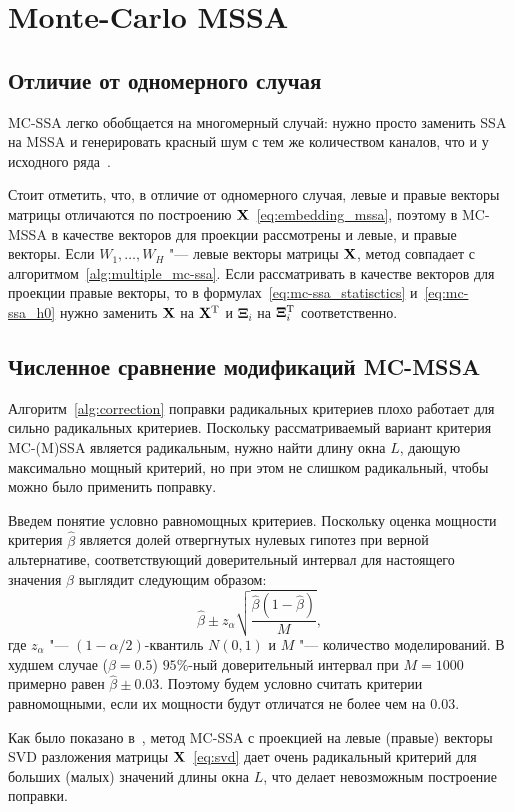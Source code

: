 \documentclass[specialist,
substylefile = spbu_report.rtx,
subf,href,colorlinks=true, 12pt]{disser}
\theoremstyle{definition}
\begin{document}
\section{Monte-Carlo MSSA}\label{sect:mc-mssa}
\subsection{Отличие от одномерного случая}
MC-SSA легко обобщается на многомерный случай: нужно просто заменить SSA на MSSA и генерировать красный шум с тем же количеством каналов, что и у исходного ряда~\cite{mc-mssa}.

Стоит отметить, что, в отличие от одномерного случая, левые и правые векторы матрицы отличаются по построению $\mathbf{X}$~\eqref{eq:embedding_mssa}, поэтому в MC-MSSA в качестве векторов для проекции рассмотрены и левые, и правые векторы. Если $W_1,\ldots,W_H$ "--- левые векторы матрицы $\mathbf{X}$, метод совпадает с алгоритмом~\ref{alg:multiple_mc-ssa}. Если рассматривать в качестве векторов для проекции правые векторы, то в формулах~\eqref{eq:mc-ssa_statisctics} и~\eqref{eq:mc-ssa_h0} нужно заменить $\mathbf{X}$ на $\mathbf{X}^{\mathrm{T}}$ и $\mathbf{\Xi}_i$ на $\mathbf{\Xi}_i^{\mathrm{T}}$ соответственно.

\subsection{Численное сравнение модификаций MC-MSSA}\label{sect:mc-mssa_numeric_comparison}
Алгоритм~\ref{alg:correction} поправки радикальных критериев плохо работает для сильно радикальных критериев. Поскольку рассматриваемый вариант критерия MC-(M)SSA является радикальным, нужно найти длину окна $L$, дающую максимально мощный критерий, но при этом не слишком радикальный, чтобы можно было применить поправку.

Введем понятие условно равномощных критериев. Поскольку оценка мощности критерия $\hat \beta$ является долей отвергнутых нулевых гипотез при верной альтернативе, соответствующий доверительный интервал для настоящего значения $\beta$ выглядит следующим образом:
\[
	\hat \beta \pm z_\alpha \sqrt{\frac{\hat \beta(1 - \hat \beta)}M},
\]
где $z_\alpha$ "--- $(1-\alpha/2)$-квантиль $N(0, 1)$ и $M$ "--- количество моделирований. В худшем случае ($\beta=0.5$) $95\%$-ный доверительный интервал при $M=1000$ примерно равен $\hat\beta \pm 0.03$. Поэтому будем условно считать критерии равномощными, если их мощности будут отличатся не более чем на $0.03$.

Как было показано в~\cite[Приложение  Б.2.4]{Larin_2022}, метод MC-SSA с проекцией на левые (правые) векторы SVD разложения матрицы $\mathbf{X}$~\eqref{eq:svd} дает очень радикальный критерий для больших (малых) значений длины окна $L$, что делает невозможным построение поправки.
\end{document}
